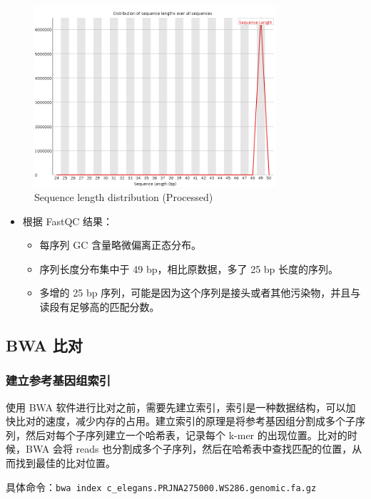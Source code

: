 \documentclass[UTF8]{ctexart}
\begin{document}
\begin{figure}[!htb]
	\centering
	\includegraphics[width=0.8\textwidth]{img/SRR14325859_FastQC_Processed_img/sequence_length_distribution.png}	%
	\caption{Sequence length distribution (Processed)\protect}    %
\end{figure}

\begin{itemize}
	\item 根据 FastQC 结果：
	\begin{itemize}
		\item 每序列 GC 含量略微偏离正态分布。
		\item 序列长度分布集中于 49 bp，相比原数据，多了 25 bp 长度的序列。
		\item 多增的 25 bp 序列，可能是因为这个序列是接头或者其他污染物，并且与读段有足够高的匹配分数。
	\end{itemize}
\end{itemize}

\subsection{BWA 比对}

\subsubsection{建立参考基因组索引}

使用 BWA 软件进行比对之前，需要先建立索引，索引是一种数据结构，可以加快比对的速度，减少内存的占用。建立索引的原理是将参考基因组分割成多个子序列，然后对每个子序列建立一个哈希表，记录每个 k-mer 的出现位置。比对的时候，BWA 会将 reads 也分割成多个子序列，然后在哈希表中查找匹配的位置，从而找到最佳的比对位置。

具体命令：\verb|bwa index c_elegans.PRJNA275000.WS286.genomic.fa.gz|
\end{document}
